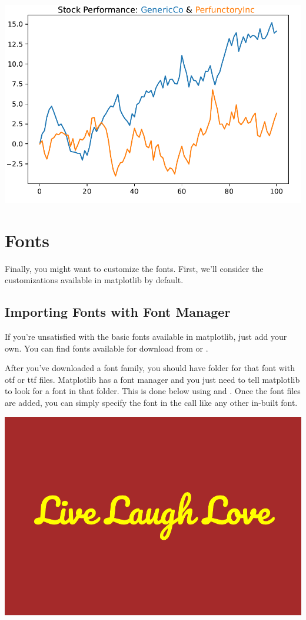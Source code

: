 

\begin{center}
    \includegraphics[width = .80\textwidth]{figures/proseplots/color-title-ex.pdf}
\end{center}

\section{Fonts}

Finally, you might want to customize the fonts. First, we'll consider the customizations available in matplotlib by default. 



\subsection{Importing Fonts with Font Manager}
If you're unsatisfied with the basic fonts available in matplotlib, just add your own. You can find fonts available for download from  or . 

After you've downloaded a font family, you should have folder for that font with otf or ttf files. Matplotlib has a font manager and you just need to tell matplotlib to look for a font in that folder. This is done below using  and . Once the font files are added, you can simply specify the font in the  call like any other in-built font. 



\begin{center}
    \includegraphics[width = .7\textwidth]{figures/proseplots/font.pdf}
\end{center}
